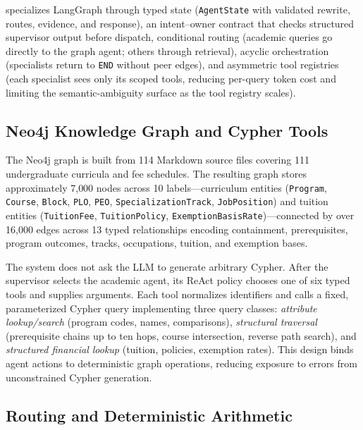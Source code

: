 \system{} specializes LangGraph through typed state (\texttt{AgentState} with validated rewrite, routes, evidence, and response), an intent--owner contract that checks structured supervisor output before dispatch, conditional routing (academic queries go directly to the graph agent; others through retrieval), acyclic orchestration (specialists return to \texttt{END} without peer edges), and asymmetric tool registries (each specialist sees only its scoped tools, reducing per-query token cost and limiting the semantic-ambiguity surface as the tool registry scales).

\subsection{Neo4j Knowledge Graph and Cypher Tools}
\label{sec:neo4j_graph}

The Neo4j graph is built from 114 Markdown source files covering 111 undergraduate curricula and fee schedules. The resulting graph stores approximately 7{,}000 nodes across 10 labels---curriculum entities (\texttt{Program}, \texttt{Course}, \texttt{Block}, \texttt{PLO}, \texttt{PEO}, \texttt{SpecializationTrack}, \texttt{JobPosition}) and tuition entities (\texttt{TuitionFee}, \texttt{TuitionPolicy}, \texttt{ExemptionBasisRate})---connected by over 16{,}000 edges across 13 typed relationships encoding containment, prerequisites, program outcomes, tracks, occupations, tuition, and exemption bases.

The system does not ask the LLM to generate arbitrary Cypher. After the supervisor selects the academic agent, its ReAct policy chooses one of six typed tools and supplies arguments. Each tool normalizes identifiers and calls a fixed, parameterized Cypher query implementing three query classes: \emph{attribute lookup/search} (program codes, names, comparisons), \emph{structural traversal} (prerequisite chains up to ten hops, course intersection, reverse path search), and \emph{structured financial lookup} (tuition, policies, exemption rates). This design binds agent actions to deterministic graph operations, reducing exposure to errors from unconstrained Cypher generation.

\subsection{Routing and Deterministic Arithmetic}
\label{sec:algorithms}

